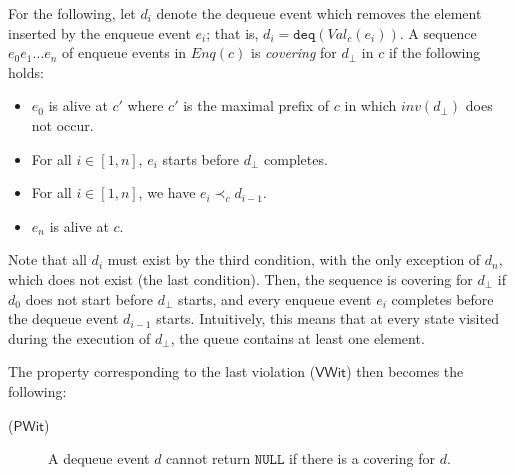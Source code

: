 \documentclass{LMCS}
\newcommand{\NULL}{\ensuremath{\mathtt{NULL}}}
\newcommand{\deq}{\ensuremath{\mathtt{deq}}}
\newcommand{\Enq}[1]{\ensuremath{\mathit{Enq}({#1})}}
\newcommand{\Val}[2]{\ensuremath{\mathit{Val}_{#1}({#2})}}
\newcommand{\dhat}{\ensuremath{d_{\bot}}}
\newcommand{\VWit}{\ensuremath{\mathsf{VWit}}}
\newcommand{\PWit}{\ensuremath{\mathsf{PWit}}}
\begin{document}
For the following, let $d_i$ denote the dequeue event which removes the element inserted by the enqueue event $e_i$; that is, $d_i=\deq(\Val{c}{e_i})$.
A sequence $e_0e_1\ldots e_n$ of enqueue events in $\Enq c$ is {\em covering} for $\dhat$ in $c$ if the following holds:
\begin{itemize}
\item $e_0$ is alive at $c'$ where $c'$ is the maximal prefix of $c$ in which $inv(\dhat)$ does not occur.
\item For all $i\in[1,n]$, $e_i$ starts before $\dhat$ completes.
\item For all $i\in[1,n]$, we have $e_i\prec_c d_{i-1}$.
\item $e_n$ is alive at $c$.
\end{itemize}
Note that all $d_i$ must exist by the third condition, with the only exception of $d_n$, which does not exist (the last condition).
Then, the sequence is covering for $\dhat$ if $d_0$ does not start before $\dhat$ starts, and every enqueue event $e_i$ completes before the dequeue event $d_{i-1}$ starts.
Intuitively, this means that at every state visited during the execution of $\dhat$, the queue contains at least one element. 

The property corresponding to the last violation (\VWit) then becomes the following:
\begin{description}
\item[(\PWit)] A dequeue event $d$ cannot return {\NULL} if there is a covering for $d$.
\end{description}
\end{document}
